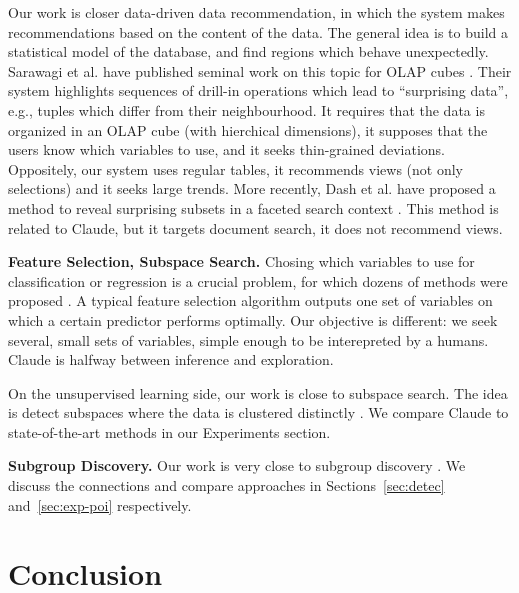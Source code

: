 Our work is closer data-driven data recommendation, in which the system makes
recommendations based on the content of the data. The general idea is to build
a statistical model of the database, and find regions which behave
unexpectedly. Sarawagi et al. have published seminal work on this topic for
OLAP cubes \cite{sarawagi1998discovery}. Their system highlights sequences of
drill-in operations which lead to ``surprising data'', e.g., tuples which
differ from their neighbourhood. It requires that the data is organized in an
OLAP cube (with hierchical dimensions), it supposes that the users know which
variables to use, and it seeks thin-grained deviations. Oppositely, our system
uses regular tables, it recommends views (not only selections) and it seeks
large trends. More recently, Dash et al. have proposed a method to reveal
surprising subsets in a faceted search context \cite{dash2008dynamic}. This
method is related to Claude, but it targets document search, it does not
recommend views.


\textbf{Feature Selection, Subspace Search.} Chosing which variables to use for
classification or regression is a crucial problem, for which dozens of methods
were proposed \cite{guyon2003introduction}. A typical feature selection
algorithm outputs one set of variables on which a certain predictor performs
optimally. Our objective is different: we seek several, small sets of variables,
simple enough to be interepreted by a humans. Claude is halfway between
inference and exploration.

On the unsupervised learning side, our work is close to subspace search. The
idea is detect subspaces where the data is clustered distinctly
\cite{keller2012hics,nguyen20134s}. We compare Claude to state-of-the-art
methods in our Experiments section.

\textbf{Subgroup Discovery.} Our work is very close to subgroup discovery
\cite{klosgen1996explora, wrobel1997algorithm, van2011non}. We discuss the
connections and compare approaches in Sections~\ref{sec:detec}
and~\ref{sec:exp-poi} respectively.

\section{Conclusion}
